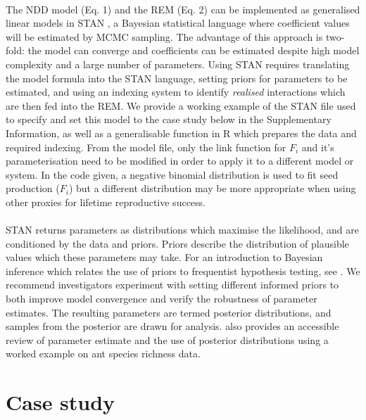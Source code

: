 \documentclass[a4,12pt]{article}
\begin{document}
        \paragraph{}        
        The NDD model (Eq. 1) and the REM (Eq. 2) can be implemented as generalised linear models in STAN \parencite{Carpenter2017}, a Bayesian statistical language where coefficient values will be estimated by MCMC sampling. The advantage of this approach is two-fold: the model can converge and coefficients can be estimated despite high model complexity and a large number of parameters. Using STAN requires translating the model formula into the STAN language, setting priors for parameters to be estimated, and using an indexing system to identify \textit{realised} interactions which are then fed into the REM. We provide a working example of the STAN file used to specify and set this model to the case study below in the Supplementary Information, as well as a generalisable function in R which prepares the data and required indexing. From the model file, only the link function for $F_i$ and it's parameterisation need to be modified in order to apply it to a different model or system. In the code given, a negative binomial distribution is used to fit seed production ($F_i$) but a different distribution may be more appropriate when using other proxies for lifetime reproductive success.   

        \paragraph{}
        STAN returns parameters as distributions which maximise the likelihood, and are conditioned by the data and priors. Priors describe the distribution of plausible values which these parameters may take. For an introduction to Bayesian inference which relates the use of priors to frequentist hypothesis testing, see \textcite{Ellison1996}. We recommend investigators experiment with setting different informed priors to both improve model convergence and verify the robustness of parameter estimates. The resulting parameters are termed posterior distributions, and samples from the posterior are drawn for analysis. \textcite{Ellison2004} also provides an accessible review of parameter estimate and the use of posterior distributions using a worked example on ant species richness data.


    \section{Case study}
\end{document}
